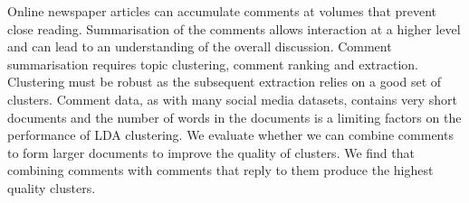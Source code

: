 Online newspaper articles can accumulate comments at volumes that prevent close reading. Summarisation of the comments allows interaction at a higher level and can lead to an understanding of the overall discussion. Comment summarisation requires topic clustering, comment ranking and extraction. Clustering must be robust as the subsequent extraction relies on a good set of clusters. Comment data, as with many social media datasets, contains very short documents and the number of words in the documents is a limiting factors on the performance of LDA clustering. We evaluate whether we can combine comments to form larger documents to improve the quality of clusters. We find that combining comments with comments that reply to them produce the highest quality clusters.
